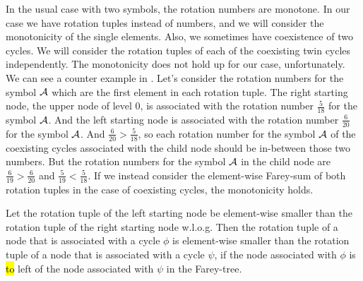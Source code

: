In the usual case with two symbols, the rotation numbers are monotone.
In our case we have rotation tuples instead of numbers, and we will consider the monotonicity of the single elements.
Also, we sometimes have coexistence of two cycles.
We will consider the rotation tuples of each of the coexisting twin cycles independently.
The monotonicity does not hold up for our case, unfortunately.
We can see a counter example in .
Let's consider the rotation numbers for the symbol $\mathcal{A}$ which are the first element in each rotation tuple.
The right starting node, the upper node of level 0, is associated with the rotation number $\frac{5}{18}$ for the symbol $\mathcal{A}$.
And the left starting node is associated with the rotation number $\frac{6}{20}$ for the symbol $\mathcal{A}$.
And $\frac{6}{20} > \frac{5}{18}$, so each rotation number for the symbol $\mathcal{A}$ of the coexisting cycles associated with the child node should be in-between those two numbers.
But the rotation numbers for the symbol $\mathcal{A}$ in the child node are $\frac{6}{19} > \frac{6}{20}$ and $\frac{5}{19} < \frac{5}{18}$.
If we instead consider the element-wise Farey-sum of both rotation tuples in the case of coexisting cycles, the monotonicity holds.

\begin{theorem}
	\label{theorem:rotation.monotonicity}
	Let the rotation tuple of the left starting node be element-wise smaller than the rotation tuple of the right starting node w.l.o.g.
	Then the rotation tuple of a node that is associated with a cycle $\phi$ is element-wise smaller than the rotation tuple of a node that is associated with a cycle $\psi$,
	if the node associated with $\phi$ is \hl{to} left of the node associated with $\psi$ in the Farey-tree.
\end{theorem}

